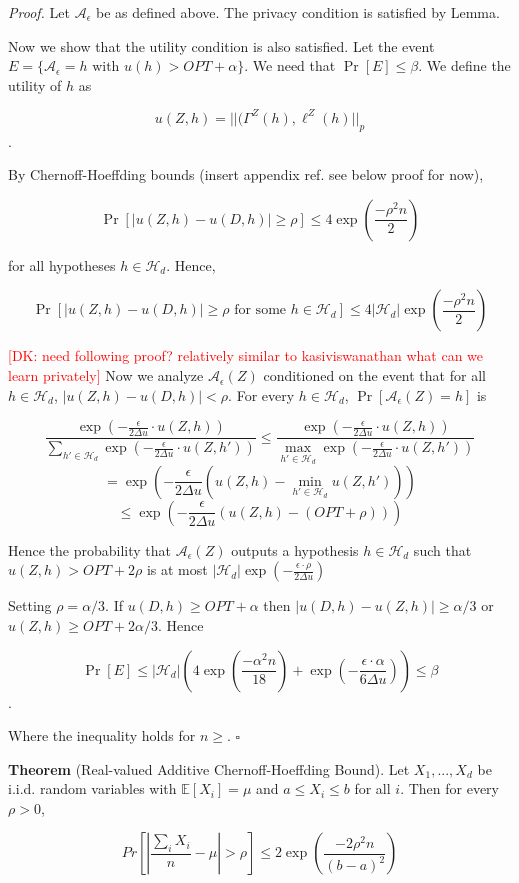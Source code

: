 \documentclass[runningheads]{article}
\newcommand{\dk}[1]{\textcolor{red}{[DK: #1]}}
\newcommand{\A}{\mathcal{A}}
\renewcommand{\H}{\mathcal{H}}
\newcommand{\1}{\mathbbm{1}}
\theoremstyle{definition}
\begin{document}
{\it Proof.} Let $\A_{\epsilon}$ be as defined above. The privacy condition is satisfied by Lemma.

Now we show that the utility condition is also satisfied. Let the event $E = \{\A_{\epsilon} = h \text{ with } u(h) > OPT + \alpha\}$. We need that $\Pr[E] \leq \beta$. We define the utility of $h$ as

$$u(Z,h) = ||(\Gamma^Z(h), \ell^Z(h)||_{p}$$.

By Chernoff-Hoeffding bounds (insert appendix ref. see below proof for now),



$$\Pr[|u(Z,h) - u(D,h)| \geq \rho] \leq 4\exp(\frac{-\rho^2n}{2})$$

for all hypotheses $h \in \H_d$. Hence, 

$$\Pr[|u(Z,h) - u(D,h)| \geq \rho \text{ for some } h \in \H_d] \leq 4|\H_d|\exp(\frac{-\rho^2n}{2})$$

\dk{need following proof? relatively similar to kasiviswanathan what can we learn privately}
Now we analyze $\A_\epsilon(Z)$ conditioned on the event that for all $h\in \H_d$, $|u(Z,h) - u(D,h)| < \rho$. For every $h \in \H_d$, $\Pr[\A_\epsilon(Z) = h]$ is 

$$\frac{\exp(-\frac{\epsilon}{2\Delta u} \cdot u(Z,h))}{\sum_{h'\in\H_d}\exp(-\frac{\epsilon}{2\Delta u} \cdot u(Z,h'))} \leq \frac{\exp(-\frac{\epsilon}{2\Delta u} \cdot u(Z,h))}{\max_{h'\in\H_d}\exp(-\frac{\epsilon}{2\Delta u} \cdot u(Z,h'))} $$
$$= \exp(-\frac{\epsilon}{2\Delta u}(u(Z,h) - \min_{h'\in\H_d}u(Z,h')))$$
$$\leq \exp(-\frac{\epsilon}{2\Delta u}(u(Z,h) - (OPT + \rho)))$$

Hence the probability that $\A_\epsilon(Z)$ outputs a hypothesis $h \in \H_d$ such that $u(Z,h) > OPT + 2\rho$ is at most $|\H_d|\exp(-\frac{\epsilon\cdot\rho}{2\Delta u})$

Setting $\rho = \alpha/3$. If $u(D,h) \geq OPT + \alpha$ then $|u(D,h) - u(Z,h)| \geq \alpha/3$ or $u(Z,h) \geq OPT + 2\alpha/3$. Hence

$$\Pr[E] \leq |\H_d|(4\exp(\frac{-\alpha^2n}{18}) + \exp(-\frac{\epsilon\cdot\alpha}{6\Delta u})) \leq \beta$$.

Where the inequality holds for $n \geq $. $\square$ 

{\bf Theorem} (Real-valued Additive Chernoff-Hoeffding Bound). Let $X_1,...,X_d$ be i.i.d. random variables with $\mathbb{E}[X_i] = \mu$ and $a \leq X_i \leq b$ for all $i$. Then for every $\rho > 0$,

$$Pr[|\frac{\sum_i X_i}{n} - \mu| > \rho] \leq 2\exp(\frac{-2\rho^2n}{(b-a)^2})$$
\end{document}
